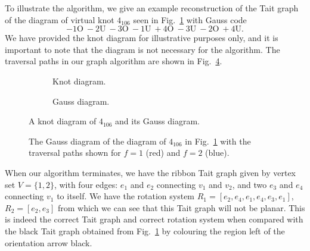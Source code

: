 \documentclass[12pt]{report}
\renewcommand{\over}{\text{O}}
\newcommand{\under}{\text{U}}
\theoremstyle{upright}
\begin{document}
To illustrate the algorithm, we give an example reconstruction of the Tait graph of the diagram of virtual knot $4_{106}$ seen in Fig.~\ref{fig:4_106-vknot} with Gauss code
\[-1\over\ -2\under\ -3\over\ -1\under\ +4\over\ -3\under\ -2\over\ +4\under.\]
We have provided the knot diagram for illustrative purposes only, and it is important to note that the diagram is not necessary for the algorithm. The traversal paths in our graph algorithm are shown in Fig.~\ref{fig:gauss-diagram-4_106-traversal}.

\begin{figure}[hbt]
	\centering
	\hspace*{\fill}
	\begin{subfigure}[b]{0.4 \textwidth}
		\centering
		\def\svgscale{0.4}
		
		\caption{Knot diagram.}
		\label{fig:4_106-vknot}
	\end{subfigure}
	\hspace*{\fill} \hspace*{\fill}	\hspace*{\fill}
	\begin{subfigure}[b]{0.4 \textwidth}
		\centering
		\def\svgscale{1.35}
		
		\caption{Gauss diagram.}
		\label{fig:gauss-diagram-4_106}
	\end{subfigure}
	\hspace*{\fill} 
	\caption{A knot diagram of $4_{106}$ and its Gauss diagram.}
	\label{fig:knot-gauss-4_106}
\end{figure}

\begin{figure}[hbt!]
	\centering
	\def\svgscale{1.35}
	
	
	\caption{The Gauss diagram of the diagram of $4_{106}$ in Fig.~\ref{fig:4_106-vknot} with the traversal paths shown for $f = 1$ (red) and $f = 2$ (blue).}
	\label{fig:gauss-diagram-4_106-traversal}
\end{figure}

When our algorithm terminates, we have the ribbon Tait graph given by vertex set $V = \{1, 2\}$, with four edges: $e_{1}$ and $e_{2}$ connecting $v_{1}$ and $v_{2}$, and two $e_{3}$ and $e_{4}$ connecting $v_{1}$ to itself. We have the rotation system $R_{1} = [e_{2}, e_{4}, e_{1}, e_{4}, e_{3}, e_{1}]$, $R_{2} = [e_{2}, e_{3}]$ from which we can see that this Tait graph will not be planar. This is indeed the correct Tait graph and correct rotation system when compared with the black Tait graph obtained from Fig.~\ref{fig:4_106-vknot} by colouring the region left of the orientation arrow black.
\end{document}
